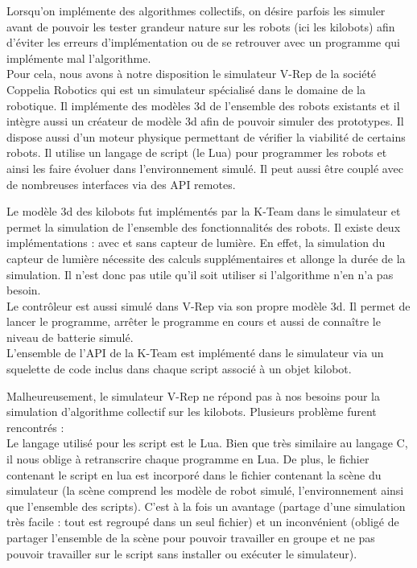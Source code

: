 \documentclass[a4paper,8pt]{report}
\begin{document}
Lorsqu'on impl\'emente des algorithmes collectifs, on d\'esire parfois les simuler avant de pouvoir les tester grandeur nature sur les robots (ici les kilobots) afin d'\'eviter les erreurs d'impl\'ementation ou de se retrouver avec un programme qui impl\'emente mal l'algorithme. \\
Pour cela, nous avons \`a notre disposition le simulateur V-Rep de la soci\'et\'e Coppelia Robotics qui est un simulateur sp\'ecialis\'e dans le domaine de la robotique. Il impl\'emente des mod\`eles 3d de l'ensemble des robots existants et il int\`egre aussi un cr\'eateur de mod\`ele 3d afin de pouvoir simuler des prototypes. Il dispose aussi d'un moteur physique permettant de v\'erifier la viabilit\'e de certains robots. Il utilise un langage de script (le Lua) pour programmer les robots et ainsi les faire \'evoluer dans l'environnement simul\'e. Il peut aussi \^etre coupl\'e avec de nombreuses interfaces via des API remotes.

\smallskip
Le mod\`ele 3d des kilobots fut impl\'ement\'es par la K-Team dans le simulateur et permet la simulation de l'ensemble des fonctionnalit\'es des robots. Il existe deux impl\'ementations : avec et sans capteur de lumi\`ere. En effet, la simulation du capteur de lumi\`ere n\'ecessite des calculs suppl\'ementaires et allonge la dur\'ee de la simulation. Il n'est donc pas utile qu'il soit utiliser si l'algorithme n'en n'a pas besoin. \\
Le contr\^oleur est aussi simul\'e dans V-Rep via son propre mod\`ele 3d. Il permet de lancer le programme, arr\^eter le programme en cours et aussi de connaître le niveau de batterie simul\'e. \\
L'ensemble de l'API de la K-Team est impl\'ement\'e dans le simulateur via un squelette de code inclus dans chaque script associ\'e \`a un objet kilobot.

\smallskip
Malheureusement, le simulateur V-Rep ne r\'epond pas \`a nos besoins pour la simulation d'algorithme collectif sur les kilobots. Plusieurs probl\`eme furent rencontr\'es : \\ 

\smallskip
Le langage utilis\'e pour les script est le Lua. Bien que tr\`es similaire au langage C, il nous oblige \`a retranscrire chaque programme en Lua. De plus, le fichier contenant le script en lua est incorpor\'e dans le fichier contenant la sc\`ene du simulateur (la sc\`ene comprend les mod\`ele de robot simul\'e, l'environnement ainsi que l'ensemble des scripts). C'est \`a la fois un avantage (partage d'une simulation tr\`es facile : tout est regroup\'e dans un seul fichier) et un inconv\'enient (oblig\'e de partager l'ensemble de la sc\`ene pour pouvoir travailler en groupe et ne pas pouvoir travailler sur le script sans installer ou ex\'ecuter le simulateur).
\end{document}
